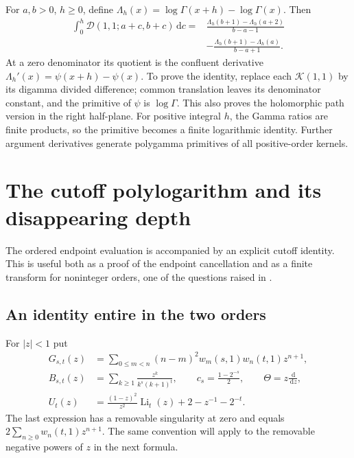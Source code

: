 \documentclass[11pt,a4paper]{article}
\numberwithin{equation}{section}
\theoremstyle{definition}
\theoremstyle{remark}
\DeclareMathOperator{\Li}{Li}
\newcommand{\dd}{\,\mathrm d}
\newcommand{\Kern}{\mathcal K}
\newcommand{\Def}{\mathcal D}
\begin{document}
For $a,b>0$, $h\ge0$, define
$\Lambda_h(x)=\log\Gamma(x+h)-\log\Gamma(x)$.
Then
\begin{equation}\label{eq:gamma-primitive}
 \begin{split}
 \int_0^h\Def(1,1;a+c,b+c)\dd c
 ={}&\frac{\Lambda_h(b+1)-\Lambda_h(a+2)}{b-a-1}\\
 &-\frac{\Lambda_h(b+1)-\Lambda_h(a)}{b-a+1}.
 \end{split}
\end{equation}
At a zero denominator its quotient is the confluent derivative
$\Lambda_h'(x)=\psi(x+h)-\psi(x)$. To prove the identity, replace
each $\Kern(1,1)$ by its digamma divided difference; common
translation leaves its denominator constant, and the primitive of
$\psi$ is $\log\Gamma$. This also proves the holomorphic path version
in the right half-plane. For positive integral $h$, the Gamma ratios
are finite products, so the primitive becomes a finite logarithmic
identity. Further argument derivatives generate polygamma primitives
of all positive-order kernels.

\section{The cutoff polylogarithm and its disappearing depth}
\label{sec:polylog}

The ordered endpoint evaluation is accompanied by an explicit cutoff
identity. This is useful both as a proof of the endpoint cancellation
and as a finite transform for noninteger orders, one of the questions
raised in \cite{repo:finite}.

\subsection{An identity entire in the two orders}

For $|z|<1$ put
\begin{align}
 G_{s,t}(z)&=\sum_{0\le m<n}(n-m)^2
             w_m(s,1)w_n(t,1)z^{n+1},\label{eq:cutoff-g}\\
 B_{s,t}(z)&=\sum_{k\ge1}\frac{z^k}{k^s(k+1)^t},
 \qquad c_s=\frac{1-2^{-s}}2,\qquad \Theta=z\frac{\dd}{\dd z},
 \label{eq:cutoff-b}\\
 U_t(z)&=\frac{(1-z)^2}{z^2}\Li_t(z)+2-z^{-1}-2^{-t}.
 \label{eq:cutoff-u}
\end{align}
The last expression has a removable singularity at zero and equals
$2\sum_{n\ge0}w_n(t,1)z^{n+1}$. The same convention will apply to
the removable negative powers of $z$ in the next formula.
\end{document}
